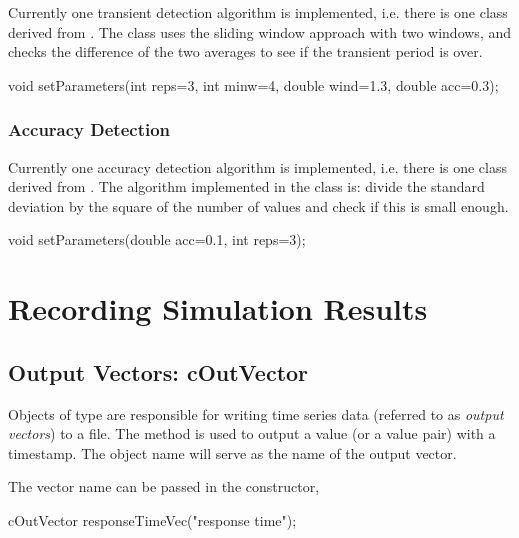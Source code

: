 Currently one transient detection algorithm
is implemented, i.e.  there is one class derived from
. The  class
uses the sliding window approach with two windows, and checks the
difference of the two averages to see if the transient period is over.

\begin{cpp}
void setParameters(int reps=3,
                   int minw=4,
                   double wind=1.3,
                   double acc=0.3);
\end{cpp}

\subsubsection{Accuracy Detection}


Currently one accuracy detection algorithm
is implemented, i.e.  there is one class derived from
. The algorithm implemented in the
 class is: divide the standard deviation by the
square of the number of values and check if this is small enough.

\begin{cpp}
void setParameters(double acc=0.1, int reps=3);
\end{cpp}




\section{Recording Simulation Results}
\label{sec:ch-sim-lib:result-recording}

\subsection{Output Vectors: cOutVector}
\label{sec:ch-sim-lib:coutvector}

Objects of type  are responsible for writing time series
data (referred to as \textit{output vectors}) to a file. The 
method is used to output a value (or a value pair) with a timestamp.
The object name will serve as the name of the output vector.

The vector name can be passed in the constructor,

\begin{cpp}
cOutVector responseTimeVec("response time");
\end{cpp}

